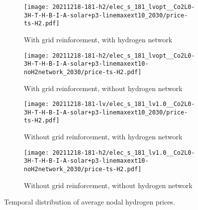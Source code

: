 \begin{figure}
    \begin{subfigure}{0.49\textwidth}
        \centering
        \caption{With grid reinforcement, with hydrogen network}
        \texttt{[image: 20211218-181-h2/elec\_s\_181\_lvopt\_\_Co2L0-3H-T-H-B-I-A-solar+p3-linemaxext10\_2030/price-ts-H2.pdf]}
    \end{subfigure}
    \begin{subfigure}{0.49\textwidth}
        \centering
        \caption{With grid reinforcement, without hydrogen network}
        \texttt{[image: 20211218-181-h2/elec\_s\_181\_lvopt\_\_Co2L0-3H-T-H-B-I-A-solar+p3-linemaxext10-noH2network\_2030/price-ts-H2.pdf]}
    \end{subfigure}
    \begin{subfigure}{0.49\textwidth}
        \centering
        \caption{Without grid reinforcement, with hydrogen network}
        \texttt{[image: 20211218-181-lv/elec\_s\_181\_lv1.0\_\_Co2L0-3H-T-H-B-I-A-solar+p3-linemaxext10\_2030/price-ts-H2.pdf]}
    \end{subfigure}
    \begin{subfigure}{0.49\textwidth}
        \centering
        \caption{Without grid reinforcement, without hydrogen network}
        \texttt{[image: 20211218-181-h2/elec\_s\_181\_lv1.0\_\_Co2L0-3H-T-H-B-I-A-solar+p3-linemaxext10-noH2network\_2030/price-ts-H2.pdf]}
    \end{subfigure}
    \caption{Temporal distribution of average nodal hydrogen prices.}
    \label{fig:si:lmp-ts-h2}
\end{figure}

